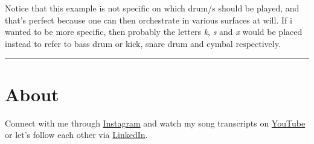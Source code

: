 \documentclass[
]{book}
\begin{document}
Notice that this example is not specific on which drum/s should be played, and that's perfect because one can then orchestrate in various surfaces at will. If i wanted to be more specific, then probably the letters \emph{k}, \emph{s} and \emph{x} would be placed instead to refer to bass drum or kick, snare drum and cymbal respectively.

\begin{center}\rule{0.5\linewidth}{0.5pt}\end{center}

\hypertarget{About}{%
\chapter{About}\label{About}}

Connect with me through \href{https://www.instagram.com/isaac.medina/}{Instagram} and watch my song transcripts on \href{https://www.youtube.com/@drumathics}{YouTube} or let's follow each other via \href{https://mx.linkedin.com/in/isaacmedina/es}{LinkedIn}.

  
\end{document}
